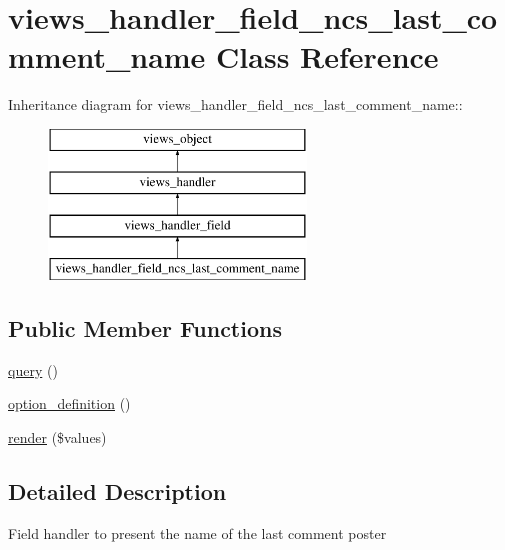 \hypertarget{classviews__handler__field__ncs__last__comment__name}{
\section{views\_\-handler\_\-field\_\-ncs\_\-last\_\-comment\_\-name Class Reference}
\label{classviews__handler__field__ncs__last__comment__name}
}
Inheritance diagram for views\_\-handler\_\-field\_\-ncs\_\-last\_\-comment\_\-name::\begin{figure}[H]
\begin{center}
\leavevmode
\includegraphics[height=4cm]{classviews__handler__field__ncs__last__comment__name}
\end{center}
\end{figure}
\subsection*{Public Member Functions}
\begin{CompactItemize}
\item 
\hyperlink{classviews__handler__field__ncs__last__comment__name_5394581513de0ee85a28aef8de302842}{query} ()
\item 
\hyperlink{classviews__handler__field__ncs__last__comment__name_ef3ee7ac3c57f689148d8909e0a3a3df}{option\_\-definition} ()
\item 
\hyperlink{classviews__handler__field__ncs__last__comment__name_eb44418e481bfca1f6dbb249a1f5c665}{render} (\$values)
\end{CompactItemize}


\subsection{Detailed Description}
Field handler to present the name of the last comment poster 

